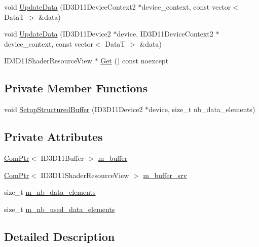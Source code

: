 \begin{DoxyCompactItemize}
\item 
void \hyperlink{structmage_1_1_structured_buffer_a91db172da7bb0f47e2ee12132b792436}{Update\+Data} (I\+D3\+D11\+Device\+Context2 $\ast$device\+\_\+context, const vector$<$ DataT $>$ \&data)
\item 
void \hyperlink{structmage_1_1_structured_buffer_ae650f2828bff9fe51eff48c03fbf68b9}{Update\+Data} (I\+D3\+D11\+Device2 $\ast$device, I\+D3\+D11\+Device\+Context2 $\ast$device\+\_\+context, const vector$<$ DataT $>$ \&data)
\item 
I\+D3\+D11\+Shader\+Resource\+View $\ast$ \hyperlink{structmage_1_1_structured_buffer_ad933738bc55b10aea665913a8215bab0}{Get} () const noexcept
\end{DoxyCompactItemize}
\subsection*{Private Member Functions}
\begin{DoxyCompactItemize}
\item 
void \hyperlink{structmage_1_1_structured_buffer_a1bf9c6db5b4ebb5333f15b5ee478e79d}{Setup\+Structured\+Buffer} (I\+D3\+D11\+Device2 $\ast$device, size\+\_\+t nb\+\_\+data\+\_\+elements)
\end{DoxyCompactItemize}
\subsection*{Private Attributes}
\begin{DoxyCompactItemize}
\item 
\hyperlink{namespacemage_ae74f374780900893caa5555d1031fd79}{Com\+Ptr}$<$ I\+D3\+D11\+Buffer $>$ \hyperlink{structmage_1_1_structured_buffer_adbd113ab2fe539e34587887876fe3825}{m\+\_\+buffer}
\item 
\hyperlink{namespacemage_ae74f374780900893caa5555d1031fd79}{Com\+Ptr}$<$ I\+D3\+D11\+Shader\+Resource\+View $>$ \hyperlink{structmage_1_1_structured_buffer_a94f811f1d36cf63dad600e6f89dcc40b}{m\+\_\+buffer\+\_\+srv}
\item 
size\+\_\+t \hyperlink{structmage_1_1_structured_buffer_a92c53203287f6ef5ab8ed88c7b588e72}{m\+\_\+nb\+\_\+data\+\_\+elements}
\item 
size\+\_\+t \hyperlink{structmage_1_1_structured_buffer_a8c69058d2ce956c7c1690a45e1bffb34}{m\+\_\+nb\+\_\+used\+\_\+data\+\_\+elements}
\end{DoxyCompactItemize}


\subsection{Detailed Description}
